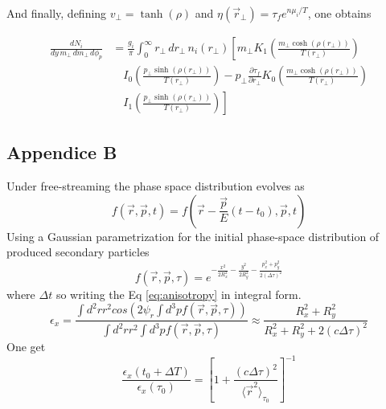 \documentclass[12pt,a4paper]{book}
\begin{document}
	And finally, defining \( v_\perp = \tanh(\rho) \) and \( \eta(\vec{r}_\perp) = \tau_f e^{n \mu_i / T} \), one obtains
	
	\begin{equation}
		\begin{aligned}
			\frac{dN_i}{dy \, m_\perp \, dm_\perp \, d\phi_p} &= \frac{g_i}{\pi} \int_{0}^{\infty} r_\perp \, dr_\perp \, n_i(r_\perp) \left[ m_\perp K_1 \left( \frac{m_\perp \cosh(\rho(r_\perp))}{T(r_\perp)}\right) \right. \\
			& \quad \left. I_0 \left( \frac{p_\perp \sinh(\rho(r_\perp))}{T(r_\perp)} \right) - p_\perp \frac{\partial \tau_f}{\partial r_\perp} K_0 \left( \frac{m_\perp \cosh(\rho(r_\perp))}{T(r_\perp)}\right) \right. \\
			& \quad \left. I_1 \left( \frac{p_\perp \sinh(\rho(r_\perp))}{T(r_\perp)} \right) \right]
		\end{aligned}
		\label{eq:momentum_cooper-frye_a}
	\end{equation}
	
	\subsection{Appendice B}
	Under free-streaming the phase space distribution evolves as
	\begin{equation}
		f(\vec{r},\vec{p}, t) = f(\vec{r} - \frac{\vec{p}}{E}(t-t_0), \vec{p}, t) 
	\end{equation}
	Using a Gaussian parametrization for the initial phase-space distribution of produced secondary particles
	\begin{equation}
		f(\vec{r},\vec{p}, \tau) =e^{- \frac{x^2}{2 R_x^2} - \frac{y^2}{2 R_y^2}- \frac{p_x^2+ p_y^2}{2 (\Delta \tau)^2}}
	\end{equation}
	where $\Delta t$ so writing the Eq \ref{eq:anisotropy} in integral form.
	\begin{equation}
		\epsilon_x = \frac{\int d^2 r r^2 cos(2 \psi_r \int d^3 p f(\vec{r},\vec{p}, \tau))}{\int d^2 r r^2  \int d^3 p f(\vec{r},\vec{p}, \tau)} \approx \frac{R_x^2 +R_y^2}{R_x^2 +R_y^2 + 2(c \Delta \tau)^2}
	\end{equation}
	One get
	\begin{equation}
		\frac{\epsilon_x(t_0 + \Delta T)}{\epsilon_x(\tau_0)} = \left[ 1 + \frac{(c \Delta \tau)^2}{\langle \vec{r}^2 \rangle_{\tau_0}} \right]^{-1}
	\end{equation}
	
\end{document}
